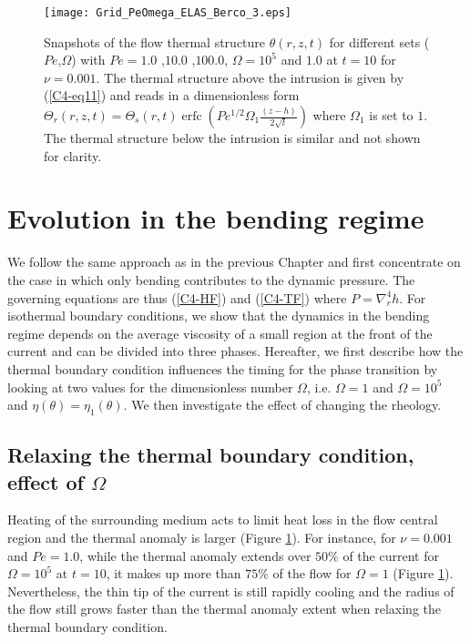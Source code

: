 \begin{figure}[h!]
  \begin{center}
    \graphicspath{ {/Users/thorey/Documents/These/Projet/Refroidissement/Skin_Model/Figure/Figure_Heating/} }
    \texttt{[image: Grid\_PeOmega\_ELAS\_Berco\_3.eps]}
    \caption{Snapshots of  the flow thermal  structure $\theta(r,z,t)$
      for  different  sets  ($Pe$,$\Omega$)  with  $Pe=  1.0$  ,$10.0$
      ,$100.0$, $\Omega=10^5$ and $1.0$ at $t=10$ for $\nu=0.001$. The
      thermal   structure   above   the    intrusion   is   given   by
      (\ref{C4-eq11})    and   reads    in   a    dimensionless   form
      $\Theta_r(r,z,t)=\Theta_s(r,t)\operatorname{erfc}{\left(Pe^{1/2}\Omega_1\frac{(z-h)}{2\sqrt{t}}\right)}$
      where $\Omega_1$ is set to  $1$. The thermal structure below the
      intrusion is similar and not shown for clarity.}
    \label{C4-Grid_PeOmega_Heating}
  \end{center}
\end{figure}


\section{Evolution in the bending regime}
\label{C4-sec:evol-bend-regime-1}

We  follow the  same approach  as in  the previous  Chapter and  first
concentrate  on the  case in  which  only bending  contributes to  the
dynamic pressure.  The governing  equations are thus (\ref{C4-HF}) and
(\ref{C4-TF})  where  $P  =  \nabla_r^4h$.   For  isothermal  boundary
conditions, we show that the dynamics in the bending regime depends on
the average  viscosity of a small  region at the front  of the current
and can be divided into three phases. Hereafter, we first describe how
the thermal  boundary condition  influences the  timing for  the phase
transition  by looking  at  two values  for  the dimensionless  number
$\Omega$,     i.e.       $\Omega=1$     and      $\Omega=10^5$     and
$\eta(\theta)=\eta_1(\theta)$.   We  then  investigate the  effect  of
changing the rheology.

\subsection{Relaxing  the   thermal  boundary  condition,   effect  of
  $\Omega$}
\label{C4-sec:infl-therm-bound-el}

Heating of the surrounding medium acts  to limit heat loss in the flow
central   region   and  the   thermal   anomaly   is  larger   (Figure
\ref{C4-Grid_PeOmega_Heating}).   For  instance, for  $\nu=0.001$  and
$Pe=1.0$, while the thermal anomaly extends over $50\%$ of the current
for $\Omega  = 10^5$ at  $t=10$, it makes up  more than $75\%$  of the
flow    for    $\Omega=1$   (Figure    \ref{C4-Grid_PeOmega_Heating}).
Nevertheless, the thin tip of the current is still rapidly cooling and
the radius  of the flow  still grows  faster than the  thermal anomaly
extent when relaxing the thermal boundary condition.

